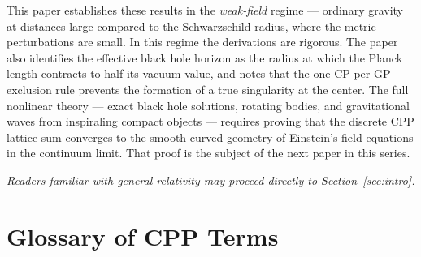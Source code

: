\documentclass[12pt]{article}
\begin{document}
This paper establishes these results in the \emph{weak-field} regime
--- ordinary gravity at distances large compared to the Schwarzschild
radius, where the metric perturbations are small. In this regime the
derivations are rigorous. The paper also identifies the effective
black hole horizon as the radius at which the Planck length contracts
to half its vacuum value, and notes that the one-CP-per-GP exclusion
rule prevents the formation of a true singularity at the center. The
full nonlinear theory --- exact black hole solutions, rotating bodies,
and gravitational waves from inspiraling compact objects --- requires
proving that the discrete CPP lattice sum converges to the smooth
curved geometry of Einstein's field equations in the continuum limit.
That proof is the subject of the next paper in this series.

\bigskip
\noindent\textit{Readers familiar with general relativity may proceed
directly to Section~\ref{sec:intro}.}


\section*{Glossary of CPP Terms}
\end{document}
